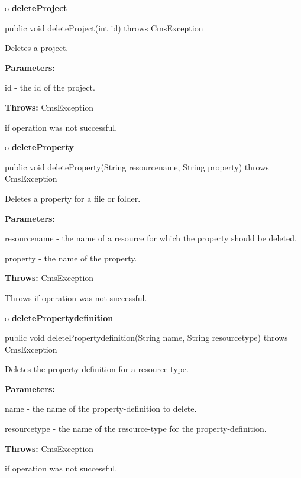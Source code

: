 o {\bf deleteProject} 

\begin{PRE}
 public void deleteProject(int id) throws CmsException
\end{PRE}

\begin{description}
\htmlDD Deletes a project. 

\begin{description}
\item {\bf Parameters:}  

id - the id of the project.  
\item {\bf Throws:} CmsException  

if operation was not successful.  
\end{description}

\end{description}

o {\bf deleteProperty} 

\begin{PRE}
 public void deleteProperty(String resourcename,
                            String property) throws CmsException
\end{PRE}

\begin{description}
\htmlDD Deletes a property for a file or folder. 

\begin{description}
\item {\bf Parameters:}  

resourcename - the name of a resource for which the property should be
deleted.  

property - the name of the property.  
\item {\bf Throws:} CmsException  

Throws if operation was not successful.  
\end{description}

\end{description}

o {\bf deletePropertydefinition} 

\begin{PRE}
 public void deletePropertydefinition(String name,
                                      String resourcetype) throws CmsException
\end{PRE}

\begin{description}
\htmlDD Deletes the property-definition for a resource type. 

\begin{description}
\item {\bf Parameters:}  

name - the name of the property-definition to delete.  

resourcetype - the name of the resource-type for the property-definition.  
\item {\bf Throws:} CmsException  

if operation was not successful.  
\end{description}

\end{description}

